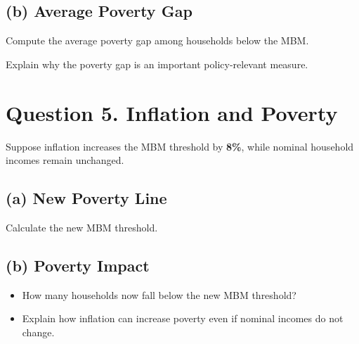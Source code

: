 \documentclass[11pt]{article}
\begin{document}
\subsection*{(b) Average Poverty Gap}

Compute the average poverty gap among households below the MBM.

Explain why the poverty gap is an important policy-relevant measure.

\section*{Question 5. Inflation and Poverty}

Suppose inflation increases the MBM threshold by \textbf{8\%}, while nominal household incomes remain unchanged.

\subsection*{(a) New Poverty Line}

Calculate the new MBM threshold.

\subsection*{(b) Poverty Impact}

\begin{itemize}
\item How many households now fall below the new MBM threshold?
\item Explain how inflation can increase poverty even if nominal incomes do not change.
\end{itemize}
\end{document}
